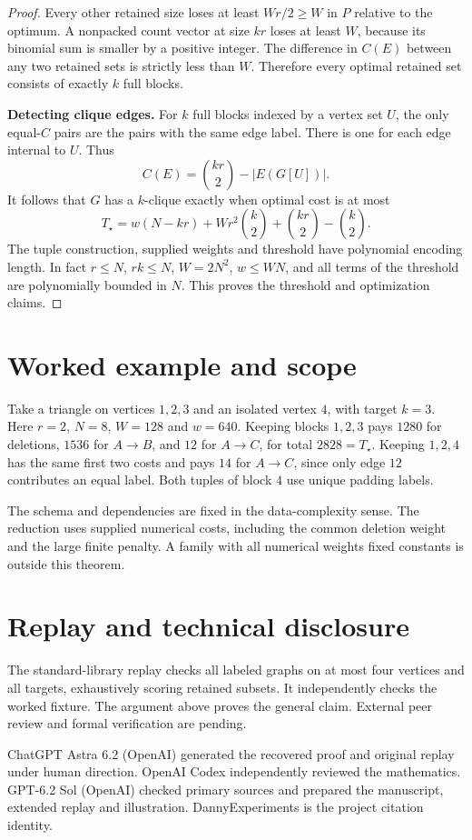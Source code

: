 \documentclass[11pt,a4paper]{amsart}
\begin{document}
\begin{proof}
Every other retained size loses at least $Wr/2\ge W$ in $P$ relative to the optimum. A nonpacked count vector at size $kr$ loses at least $W$, because its binomial sum is smaller by a positive integer. The difference in $C(E)$ between any two retained sets is strictly less than $W$. Therefore every optimal retained set consists of exactly $k$ full blocks.

\medskip
\noindent\textbf{Detecting clique edges.}
For $k$ full blocks indexed by a vertex set $U$, the only equal-$C$ pairs are the pairs with the same edge label. There is one for each edge internal to $U$. Thus
\[
   C(E)=\binom{kr}{2}-|E(G[U])|.
\]
It follows that $G$ has a $k$-clique exactly when optimal cost is at most
\[
 T_\star=w(N-kr)+Wr^2\binom{k}{2}+\binom{kr}{2}-\binom k2.
\]
The tuple construction, supplied weights and threshold have polynomial encoding length. In fact $r\le N$, $rk\le N$, $W=2N^2$, $w\le WN$, and all terms of the threshold are polynomially bounded in $N$. This proves the threshold and optimization claims.
\end{proof}

\section{Worked example and scope}
Take a triangle on vertices $1,2,3$ and an isolated vertex $4$, with target $k=3$. Here $r=2$, $N=8$, $W=128$ and $w=640$. Keeping blocks $1,2,3$ pays $1280$ for deletions, $1536$ for $A\to B$, and $12$ for $A\to C$, for total $2828=T_\star$. Keeping $1,2,4$ has the same first two costs and pays $14$ for $A\to C$, since only edge $12$ contributes an equal label. Both tuples of block $4$ use unique padding labels.

The schema and dependencies are fixed in the data-complexity sense. The reduction uses supplied numerical costs, including the common deletion weight and the large finite penalty. A family with all numerical weights fixed constants is outside this theorem.

\section*{Replay and technical disclosure}
The standard-library replay checks all labeled graphs on at most four vertices and all targets, exhaustively scoring retained subsets. It independently checks the worked fixture. The argument above proves the general claim. External peer review and formal verification are pending.

ChatGPT Astra 6.2 (OpenAI) generated the recovered proof and original replay under human direction. OpenAI Codex independently reviewed the mathematics. GPT-6.2 Sol (OpenAI) checked primary sources and prepared the manuscript, extended replay and illustration. DannyExperiments is the project citation identity.



\end{document}
